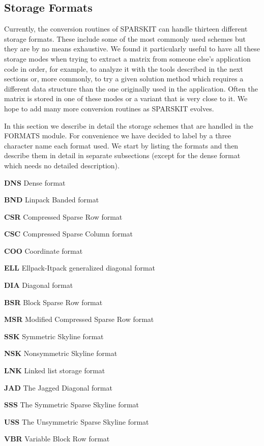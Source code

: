 \subsection{Storage Formats} 	
Currently, 
the conversion routines of SPARSKIT can handle thirteen different storage
formats. These include some of the most commonly used schemes but they
are by no means exhaustive.  We found it particularly useful to have
all these storage modes when trying to extract a matrix from someone
else's application code in order, for example, to analyze it with the
tools described in the next sections or, more commonly, to try a given
solution method which requires a different data structure than the
one originally used in the application.  Often the matrix is stored in
one of these modes or a variant that is very close to it.  We hope to
add many more conversion routines as SPARSKIT evolves.

In this section we describe in detail the storage schemes that are
handled in the FORMATS module.  For convenience we have decided to
label by a three character name each format used.  We start by listing
the formats and then describe them in detail  in separate subsections
(except for the dense format which needs no detailed description).	

\begin{description}
\item{{\bf DNS}} Dense format
\item{{\bf BND}} Linpack Banded format
\item{{\bf CSR}} Compressed Sparse Row format 
\item{{\bf CSC}} Compressed Sparse Column format 
\item{{\bf COO}} Coordinate format
\item{{\bf ELL}} Ellpack-Itpack generalized diagonal format
\item{{\bf DIA}} Diagonal format
\item{{\bf BSR}} Block Sparse Row format
\item{{\bf MSR}} Modified Compressed Sparse Row format
\item{{\bf SSK}} Symmetric Skyline format
\item{{\bf NSK}} Nonsymmetric Skyline format
\item{{\bf LNK}} Linked list storage format 
\item{{\bf JAD}} The Jagged Diagonal format 
\item{{\bf SSS}} The Symmetric Sparse Skyline format
\item{{\bf USS}} The Unsymmetric Sparse Skyline format
\item{{\bf VBR}} Variable Block Row format
\end{description}

